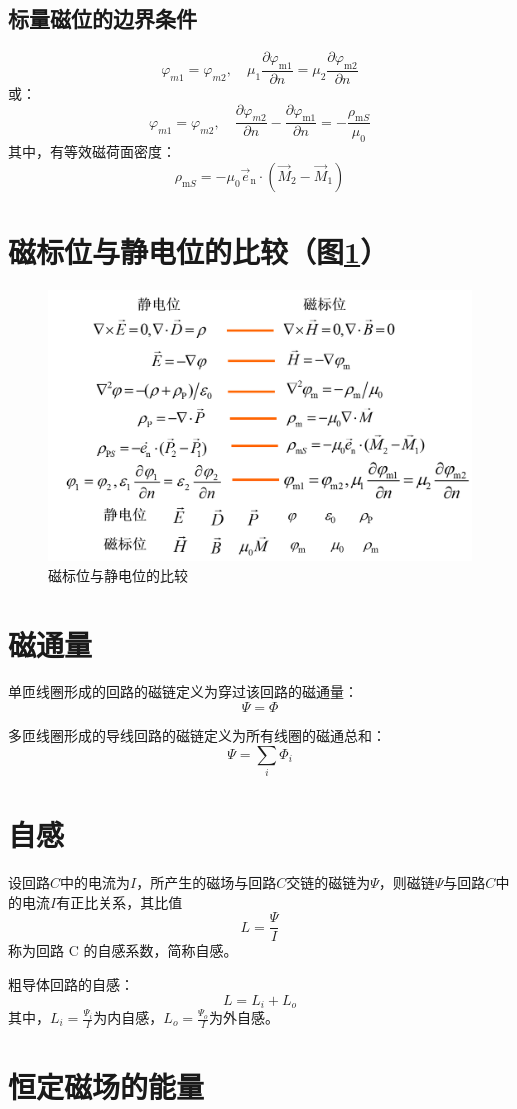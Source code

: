\subsection*{标量磁位的边界条件}
\[\varphi_{m1} = \varphi_{m2}, \quad{\mu _1}\frac{{\partial {\varphi _{{\text{m1}}}}}}
{{\partial n}} = {\mu _2}\frac{{\partial {\varphi _{{\text{m2}}}}}}
{{\partial n}}\]
或：
\[\varphi_{m1} = \varphi_{m2}, \quad\frac{{\partial {\varphi _{m2}}}}
{{\partial n}} - \frac{{\partial {\varphi _{{\text{m1}}}}}}
{{\partial n}} =  - \frac{{{\rho _{{\text{m}}S}}}}
{{{\mu _0}}}\]
其中，有等效磁荷面密度：
\[{\rho _{{\text{m}}S}} =  - {\mu _0}{\vec e_{\text{n}}}\cdot({\vec M_2} - {\vec M_1})\]

\section{磁标位与静电位的比较（图\ref{fig:magneticeleccompare}）}
\begin{figure}[h]
	\centering
	\includegraphics[width=\linewidth]{pics/磁标位与静电位的比较}
	\caption{磁标位与静电位的比较}
	\label{fig:magneticeleccompare}
\end{figure}

\section{磁通量}
单匝线圈形成的回路的磁链定义为穿过该回路的磁通量：
\[ \varPsi = \varPhi \]

多匝线圈形成的导线回路的磁链定义为所有线圈的磁通总和：
\[\Psi  = \sum_i {{\Phi _i}} \]

\section{自感}
设回路$C$中的电流为$ I $，所产生的磁场与回路$ C $交链的磁链为$ \varPsi $，则磁链$ \varPsi $与回路$ C $中的电流$ I $有正比关系，其比值
\[L = \frac{\Psi}{I}\]
称为回路 C 的自感系数，简称自感。

粗导体回路的自感：
\[ L = L_i + L_o \]
其中，$L_i = \frac{\Psi_i}{I}$为内自感，$L_o = \frac{\Psi_o}{I}$为外自感。

\section{恒定磁场的能量}















